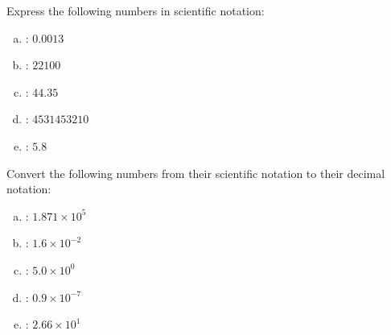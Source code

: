 \documentclass[11pt,letterpaper]{article}
\begin{document}
\vfill



 Express the following numbers in scientific notation: \pvspace{0.2cm}
\begin{enumerate}[(a)] \itemsep=2ex
\item \uans{6cm}: \qquad $0.0013$
\item \uans{6cm}: \qquad $22100$
\item \uans{6cm}: \qquad $44.35$
\item \uans{6cm}: \qquad $4531453210$
\item \uans{6cm}: \qquad $5.8$
\end{enumerate}



\vfill



 Convert the following numbers from their scientific notation to their decimal notation: \pvspace{0.2cm}
\begin{enumerate}[(a)] \itemsep=2ex
\item \uans{6cm}: \qquad $1.871 \times 10^5$
\item \uans{6cm}: \qquad $1.6 \times 10^{-2}$
\item \uans{6cm}: \qquad $5.0 \times 10^0$
\item \uans{6cm}: \qquad $0.9 \times 10^{-7}$
\item \uans{6cm}: \qquad $2.66 \times 10^1$ 
\end{enumerate}


\end{document}
